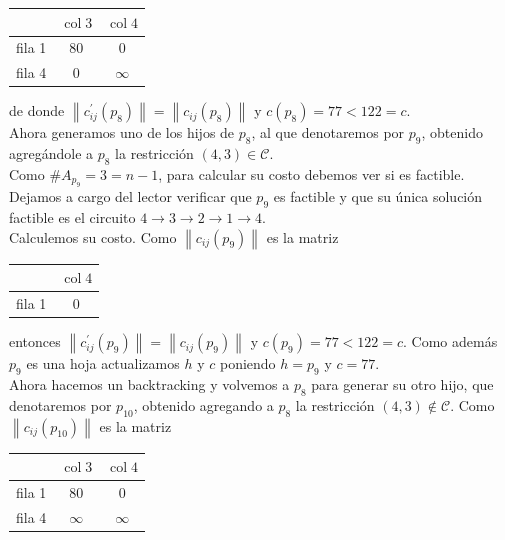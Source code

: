 \documentclass[10pt]{article}
\begin{document}
\begin{center}
\begin{tabular}{|l|c|c|}
\hline
 & $\operatorname{col} 3$ & $\operatorname{col} 4$ \\
\hline
fila 1 & 80 & 0 \\
\hline
fila 4 & 0 & $\infty$ \\
\hline
\end{tabular}
\end{center}

de donde $\left\|c_{i j}^{\prime}\left(p_{8}\right)\right\|=\left\|c_{i j}\left(p_{8}\right)\right\|$ y $c\left(p_{8}\right)=77<122=c$.\\
Ahora generamos uno de los hijos de $p_{8}$, al que denotaremos por $p_{9}$, obtenido agregándole a $p_{8}$ la restricción $(4,3) \in \mathcal{C}$.\\
Como $\# A_{p_{9}}=3=n-1$, para calcular su costo debemos ver si es factible. Dejamos a cargo del lector verificar que $p_{9}$ es factible y que su única solución factible es el circuito $4 \longrightarrow 3 \longrightarrow 2 \longrightarrow 1 \longrightarrow 4$.\\
Calculemos su costo. Como $\left\|c_{i j}\left(p_{9}\right)\right\|$ es la matriz

\begin{center}
\begin{tabular}{|c|c|}
\hline
 & $\operatorname{col} 4$ \\
\hline
fila 1 & 0 \\
\hline
\end{tabular}
\end{center}

entonces $\left\|c_{i j}^{\prime}\left(p_{9}\right)\right\|=\left\|c_{i j}\left(p_{9}\right)\right\|$ y $c\left(p_{9}\right)=77<122=c$. Como además $p_{9}$ es una hoja actualizamos $h$ y $c$ poniendo $h=p_{9}$ y $c=77$.\\
Ahora hacemos un backtracking y volvemos a $p_{8}$ para generar su otro hijo, que denotaremos por $p_{10}$, obtenido agregando a $p_{8}$ la restricción $(4,3) \notin \mathcal{C}$. Como $\left\|c_{i j}\left(p_{10}\right)\right\|$ es la matriz

\begin{center}
\begin{tabular}{|l|c|c|}
\hline
 & $\operatorname{col} 3$ & $\operatorname{col} 4$ \\
\hline
fila 1 & 80 & 0 \\
\hline
fila 4 & $\infty$ & $\infty$ \\
\hline
\end{tabular}
\end{center}
\end{document}
